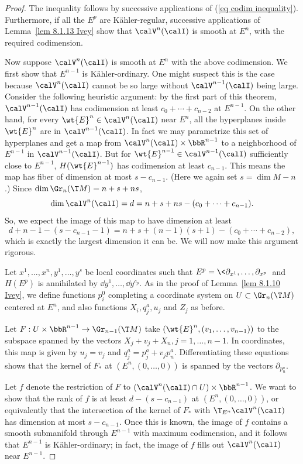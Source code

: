 \begin{proof}
    The inequality follows by successive applications of (\ref{eq codim inequality}). Furthermore, if all the $E^p$ are K\"ahler-regular, successive applications of Lemma~\ref{lem 8.1.13 Ivey} show that $\calV^n(\calI)$ is smooth at $E^n$, with the required codimension.

    Now suppose $\calV^n(\calI)$ is smooth at $E^n$ with the above codimension. We first show that $E^{n-1}$ is K\"ahler-ordinary. One might suspect this is the case because $\calV^n(\calI )$ cannot be so large without $\calV^{n-1}(\calI)$ being large. Consider the following heuristic argument: by the first part of this theorem, $\calV^{n-1}(\calI)$ has codimension at least $c_0+\cdots+c_{n-2}$ at $E^{n-1}$. On the other hand, for every $\wt{E}^n\in\calV^n(\calI)$ near $E^n$, all the hyperplanes inside $\wt{E}^n$ are in $\calV^{n-1}(\calI)$. In fact we may parametrize this set of hyperplanes and get a map from $\calV^n(\calI)\times\bbR^{n-1}$ to a neighborhood of $E^{n-1}$ in $\calV^{n-1}(\calI)$. But for $\wt{E}^{n-1}\in\calV^{n-1}(\calI)$ sufficiently close to $E^{n-1}$, $H(\wt{E}^{n-1})$ has codimension at least $c_{n-1}$. This means the map has fiber of dimension at most $s-c_{n-1}$. (Here we again set $s=\dim M-n$.) Since $\dim \Gr_n(\T M)=n+s+ns$,
    \[\dim \calV^n(\calI)=d=n+s+ns-(c_0+\cdots+c_{n-1}).\]
    So, we expect the image of this map to have dimension at least 
    \[d+n-1-(s-c_{n-1}-1)=n+s+(n-1)(s+1)-(c_0+\cdots+c_{n-2}),\]
    which is exactly the largest dimension it can be. We will now make this argument rigorous.

    Let $x^1,\ldots,x^n,y^1,\ldots,y^s$ be local coordinates such that $E^p=\<\partial_{x^1},\ldots,\partial_{x^p}\>$ and $H(E^p)$ is annihilated by $\dd y^1,\ldots,\dd y^{c_p}$. As in the proof of Lemma~\ref{lem 8.1.10 Ivey}, we define functions $p^0_i$ completing a coordinate system on $U\subset\Gr_n(\T M)$ centered at $E^n$, and also functions $X_i,q^a_j,u_j$ and $Z_j$ as before.  

    Let $F:U\times\bbR^{n-1}\to \Gr_{n-1}(\T M)$ take $(\wt{E}^n,(v_1,\ldots,v_{n-1}))$ to the subspace spanned by the vectors $X_j+v_j+X_n,j=1,\ldots,n-1$. In coordinates, this map is given by $u_j=v_j$ and $q^a_j=p^a_j+v_j p^a_n$. Differentiating these equations shows that the kernel of $F_\ast$ at $(E^n,(0,\ldots,0))$ is spanned by the vectors $\partial_{p^a_n}$.
    
    Let $f$ denote the restriction of $F$ to $(\calV^n(\calI)\cap U)\times\bbR^{n-1}$. We want to show that the rank of $f$ is at least $d-(s-c_{n-1})$ at $(E^n,(0,\ldots,0))$, or equivalently that the intersection of the kernel of $F_\ast$ with $\T_{E^n}\calV^n(\calI)$ has dimension at most $s-c_{n-1}$. Once this is known, the image of $f$ contains a smooth submanifold through $E^{n-1}$ with maximum codimension, and it follows that $E^{n-1}$ is K\"ahler-ordinary; in fact, the image of $f$ fills out $\calV^n(\calI)$ near $E^{n-1}$.


\end{proof}
